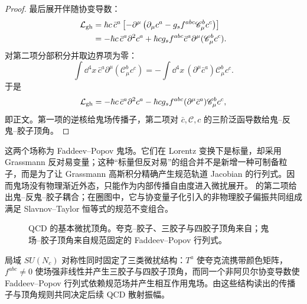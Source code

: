 \begin{proof}
最后展开伴随协变导数：
\begin{align*}
 \mathcal L_{\rm gh}
 &=\hbar c\,\bar c^a
 \left[-\partial^\mu
 \left(\partial_\mu c^a-g_sf^{abc}\mathscr C_\mu^bc^c\right)\right]\\
 &=-\hbar c\,\bar c^a\partial^2c^a
 +\hbar c g_sf^{abc}\bar c^a\partial^\mu(\mathscr C_\mu^bc^c).
\end{align*}
对第二项分部积分并取边界项为零：
\begin{equation*}
 \int\dd^4x\,\bar c^a\partial^\mu(\mathscr C_\mu^bc^c)
 =-\int\dd^4x\,(\partial^\mu\bar c^a)\mathscr C_\mu^bc^c.
\end{equation*}
于是
\begin{equation*}
 {
 \mathcal L_{\rm gh}
 =-\hbar c\,\bar c^a\partial^2c^a
 -\hbar c g_sf^{abc}(\partial^\mu\bar c^a)\mathscr C_\mu^bc^c,}
\end{equation*}
即正文。第一项的逆核给鬼场传播子，第二项对 $\bar c,\mathscr C,c$ 的三阶泛函导数给鬼--反鬼--胶子顶角。
\end{proof}

这两个场称为 Faddeev--Popov 鬼场。它们在 Lorentz 变换下是标量，却采用 Grassmann 反对易变量；这种“标量但反对易”的组合并不是新增一种可制备粒子，而是为了让 Grassmann 高斯积分精确产生规范轨道 Jacobian 的行列式。因而鬼场没有物理渐近外态，只能作为内部传播自由度进入微扰展开。 的第二项给出鬼--反鬼--胶子耦合；在圈图中，它与协变量子化引入的非物理胶子偏振共同组成满足 Slavnov--Taylor 恒等式的规范不变组合。

\begin{figure}[htbp]
\centering

\caption{QCD 的基本微扰顶角。夸克--胶子、三胶子与四胶子顶角来自；鬼场--胶子顶角来自规范固定的 Faddeev--Popov 行列式。}
\label{fig:qcd-elementary-vertices-dp10}
\end{figure}


局域 $SU(N_c)$ 对称性同时固定了三类微扰结构：$T^a$ 使夸克流携带颜色矩阵，$f^{abc}\neq0$ 使场强非线性并产生三胶子与四胶子顶角，而同一个非阿贝尔协变导数使 Faddeev--Popov 行列式依赖规范场并产生相互作用鬼场。由这些结构读出的传播子与顶角规则共同决定后续 QCD 散射振幅。



